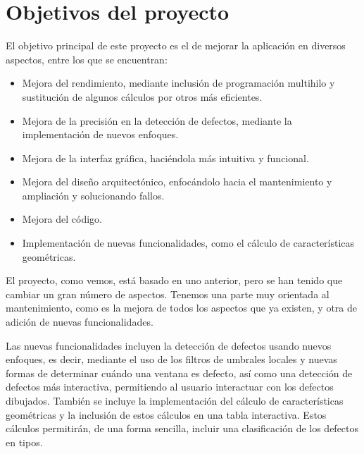 \section{Objetivos del proyecto}\label{obj}
El objetivo principal de este proyecto es el de mejorar la aplicación en diversos aspectos, entre los que se encuentran:

\begin{itemize}
\item Mejora del rendimiento, mediante inclusión de programación multihilo y sustitución de algunos cálculos por otros más eficientes.
\item Mejora de la precisión en la detección de defectos, mediante la implementación de nuevos enfoques.
\item Mejora de la interfaz gráfica, haciéndola más intuitiva y funcional.
\item Mejora del diseño arquitectónico, enfocándolo hacia el mantenimiento y ampliación y solucionando fallos.
\item Mejora del código.
\item Implementación de nuevas funcionalidades, como el cálculo de características geométricas.
\end{itemize}

El proyecto, como vemos, está basado en uno anterior, pero se han tenido que cambiar un gran número de aspectos. Tenemos una parte muy orientada al mantenimiento, como es la mejora de todos los aspectos que ya existen, y otra de adición de nuevas funcionalidades.

Las nuevas funcionalidades incluyen la detección de defectos usando nuevos enfoques, es decir, mediante el uso de los filtros de umbrales locales y nuevas formas de determinar cuándo una ventana es defecto, así como una detección de defectos más interactiva, permitiendo al usuario interactuar con los defectos dibujados. También se incluye la implementación del cálculo de características geométricas y la inclusión de estos cálculos en una tabla interactiva. Estos cálculos permitirán, de una forma sencilla, incluir una clasificación de los defectos en tipos.
\newpage



